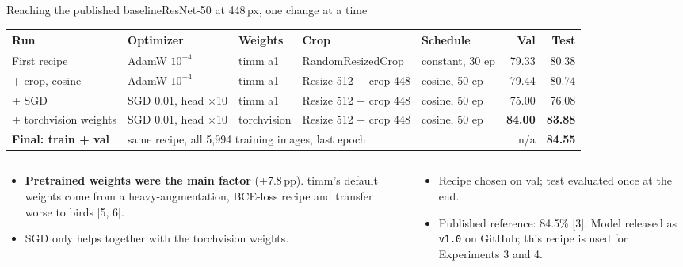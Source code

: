 \documentclass[aspectratio=169,10pt]{beamer}
\newcommand{\hl}[1]{\textcolor{accent}{#1}}
\begin{document}
\begin{frame}{Reaching the published baseline}{ResNet-50 at 448\,px, one change at a time}
\footnotesize
\begin{tabularx}{\linewidth}{@{}l l l l X r r@{}}
\toprule
\textbf{Run} & \textbf{Optimizer} & \textbf{Weights} & \textbf{Crop} & \textbf{Schedule} & \textbf{Val} & \textbf{Test}\\
\midrule
First recipe & AdamW $10^{-4}$ & timm a1 & RandomResizedCrop & constant, 30 ep & 79.33 & 80.38\\
+ crop, cosine & AdamW $10^{-4}$ & timm a1 & Resize 512 + crop 448 & cosine, 50 ep & 79.44 & 80.74\\
+ SGD & SGD 0.01, head $\times$10 & timm a1 & Resize 512 + crop 448 & cosine, 50 ep & 75.00 & 76.08\\
+ torchvision weights & SGD 0.01, head $\times$10 & torchvision & Resize 512 + crop 448 & cosine, 50 ep & \textbf{84.00} & \textbf{83.88}\\
\midrule
\textbf{Final: train + val} & \multicolumn{4}{l}{same recipe, all 5,994 training images, last epoch} & n/a & \hl{\textbf{84.55}}\\
\bottomrule
\end{tabularx}

\vspace{0.3cm}
\begin{columns}[t]
\begin{column}{0.48\textwidth}
\begin{itemize}
  \item \textbf{Pretrained weights were the main factor} (+7.8\,pp). timm's default weights come from a heavy-augmentation, BCE-loss recipe and transfer worse to birds [5, 6].
  \item SGD only helps together with the torchvision weights.
\end{itemize}
\end{column}
\begin{column}{0.48\textwidth}
\begin{itemize}
  \item Recipe chosen on val; test evaluated once at the end.
  \item Published reference: 84.5\% [3]. Model released as \texttt{v1.0} on GitHub; this recipe is used for Experiments 3 and 4.
\end{itemize}
\end{column}
\end{columns}
\end{frame}
\end{document}
